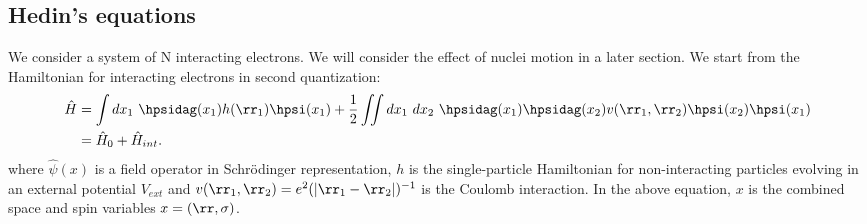 \subsection{Hedin's equations}
We consider a system of N interacting electrons. We will consider the effect of nuclei motion in a later section.
We start from the Hamiltonian for interacting electrons in second quantization:
\begin{align}
\begin{split}
 	\hat{H} &= \int dx_1 \ \hpsidag(x_1) h(\rr_1) \hpsi(x_1) + \frac{1}{2} \iint dx_1 \  dx_2 \ \hpsidag(x_1) \hpsidag(x_2) v(\rr_1,\rr_2) \hpsi(x_2)\hpsi(x_1) \\
		&= \hat{H}_0 + \hat{H}_{int}.
\end{split}
\end{align}
where $\hat{\psi}(x)$ is a field operator in Schrödinger representation, $h$ is the single-particle Hamiltonian for non-interacting particles evolving in an external potential $V_{ext}$ and $v(\rr_1,\rr_2) = e^2 (\left| \rr_1 - \rr_2 \right|)^{-1}$ is the Coulomb interaction. In the above equation, $x$ is the combined space and spin variables $x = (\rr, \sigma)$.
%

